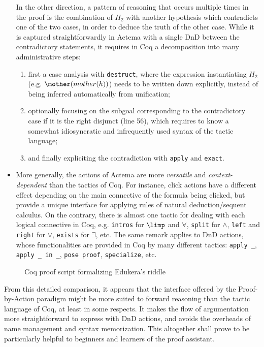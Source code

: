 \begin{itemize}
  In the other direction, a pattern of reasoning that occurs multiple times in
  the proof is the combination of $H_2$ with another hypothesis which
  contradicts one of the two cases, in order to deduce the truth of the other
  case. While it is captured straightforwardly in Actema with a single DnD
  between the contradictory statements, it requires in Coq a decomposition into
  many administrative steps:
  \begin{enumerate}
    \item first a case analysis with \texttt{destruct}, where the expression
    instantiating $H_2$ (e.g. $\mother(mother(h))$) needs to be written down
    explicitly, instead of being inferred automatically from unification;
    \item optionally focusing on the subgoal corresponding to the contradictory
    case if it is the right disjunct (line 56), which requires to know a
    somewhat idiosyncratic and infrequently used syntax of the tactic language;
    \item and finally expliciting the contradiction with \texttt{apply} and
    \texttt{exact}.
  \end{enumerate}

  \item More generally, the actions of Actema are more \emph{versatile} and
  \emph{context-dependent} than the tactics of Coq. For instance, click actions
  have a different effect depending on the main connective of the formula being
  clicked, but provide a unique interface for applying rules of natural
  deduction/sequent calculus. On the contrary, there is almost one tactic for
  dealing with each logical connective in Coq, e.g. \texttt{intros} for $\limp$
  and $\forall$, \texttt{split} for $\land$, \texttt{left} and \texttt{right}
  for $\lor$, \texttt{exists} for $\exists$, etc. The same remark applies to DnD
  actions, whose functionalities are provided in Coq by many different tactics:
  \texttt{apply \_}, \texttt{apply \_ in \_}, \texttt{pose proof},
  \texttt{specialize}, etc.
\end{itemize}

\begin{figure}
  
  \caption{Coq proof script formalizing Edukera's riddle}
\end{figure}

From this detailed comparison, it appears that the interface offered by the
Proof-by-Action paradigm might be more suited to forward reasoning than the
tactic language of Coq, at least in some respects. It makes the flow of
argumentation more straightforward to express with DnD actions, and avoids the
overheads of name management and syntax memorization. This altogether shall
prove to be particularly helpful to beginners and learners of the proof
assistant.


